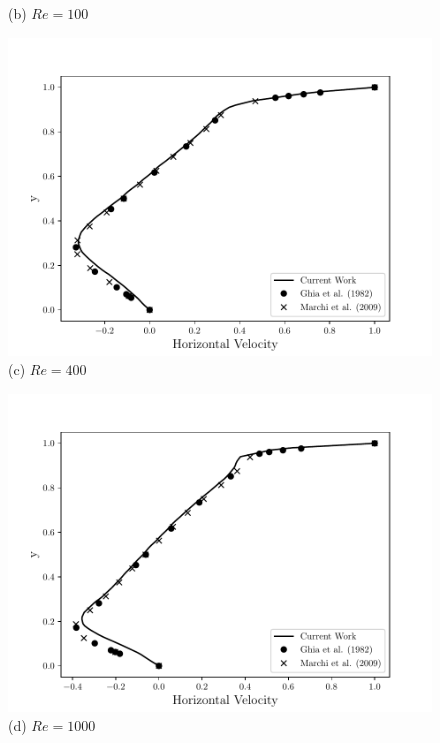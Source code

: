 \begin{center}
\begin{figure}[H]
\begin{minipage}{.5\linewidth}
      (b) $Re=100$
     \end{minipage}
     \begin{minipage}{.5\linewidth}
      \centering
      \includegraphics[scale=0.53]{./02_chaps/cap_validation/figure/Re_400_u_profile.pdf}\\
      (c) $Re=400$
     \end{minipage}%
     \begin{minipage}{.5\linewidth}
      \centering
      \includegraphics[scale=0.53]{./02_chaps/cap_validation/figure/Re_1000_u_profile.pdf}\\
      (d) $Re=1000$
     \end{minipage}
     \medskip
     \label{velocity vx cavity}
\end{figure}
\end{center}

